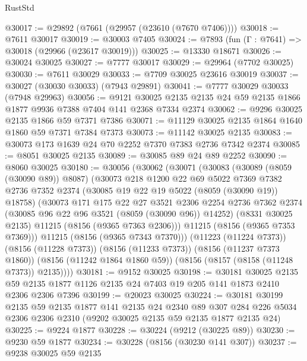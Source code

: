 \begin{lexlean}{RustStd}
\begin{coremodule}
{\begin{coremodule}
{{{{{{{{{{{{{{{{{{{{{{{{{{{{{{{{{{@30017 := @29892 (@7661 (@29957 (@23610 (@7670 @7406))))
@30018 := @7611 @30017
@30019 := @30003 @7405
@30024 := @7893 (fun (Γ : @7641) => @30018 (@29966 (@23617 @30019)))
@30025 := @13330 @18671
@30026 := @30024 @30025
@30027 := @7777 @30017
@30029 := @29964 (@7702 @30025)
@30030 := @7611 @30029
@30033 := @7709 @30025 @23616 @30019
@30037 := @30027 (@30030 @30033) (@7943 @29891)
@30041 := @7777 @30029 @30033 (@7948 @29963)
@30056 := @9121
    @30025
    @2135
    @2135
    @24
    @59
    @2135
    @1866
    @1877
    @9936
    @7388
    @7404
    @141
    @2368
    @7334
    @2374
@30062 := @9296 @30025 @2135 @1866 @59 @7371 @7386
@30071 := @11129 @30025 @2135 @1864 @1640 @1860 @59 @7371 @7384 @7373
@30073 := @11142 @30025 @2135
@30083 := @30073 @173 @1639 @24 @70 @2252 @7370 @7383 @2736 @7342 @2374
@30085 := @8051 @30025 @2135
@30089 := @30085 @89 @24 @89 @2252
@30090 := @8060 @30025
@30180 := @30056
    (@30062
      (@30071
        (@30083
          (@30089 (@8059 (@30090 @89)) @8087)
          (@30073
            @218
            @1200
            @22
            @69
            @5022
            @7369
            @7382
            @2736
            @7352
            @2374
            (@30085 @19 @22 @19 @5022 (@8059 (@30090 @19)) @18758)
            (@30073
              @171
              @175
              @22
              @27
              @3521
              @2306
              @2254
              @2736
              @7362
              @2374
              (@30085 @96 @22 @96 @3521 (@8059 (@30090 @96)) @14252)
              (@8331 @30025 @2135)
              @11215
              (@8156 (@9365 @7363 @2306)))
            @11215
            (@8156 (@9365 @7353 @7369)))
          @11215
          (@8156 (@9365 @7343 @7370)))
        (@11223 (@11224 @7373))
        (@8156 (@11228 @7373))
        (@8156 (@11233 @7373))
        (@8156 (@11237 @7373 @1860))
        (@8156 (@11242 @1864 @1860 @59))
        (@8156 (@8157 (@8158 (@11248 @7373)) @2135))))
@30181 := @9152 @30025
@30198 := @30181
    @30025
    @2135
    @59
    @2135
    @1877
    @1126
    @2135
    @24
    @7403
    @19
    @205
    @141
    @1873
    @2410
    @2306
    @2306
    @7396
@30199 := @20023 @30025
@30224 := @30181
    @30199
    @2135
    @59
    @2135
    @1877
    @141
    @2135
    @24
    @2340
    @89
    @307
    @284
    @226
    @5034
    @2306
    @2306
    @2310
    (@9202 @30025 @2135 @59 @2135 @1877 @2135 @24)
@30225 := @9224 @1877
@30228 := @30224 (@9212 (@30225 @89))
@30230 := @9230 @59 @1877
@30234 := @30228 (@8156 (@30230 @141 @307))
@30237 := @9238 @30025 @59 @2135
}}}}}}}}}}}}}}}}}}}}}}}}}}}}}}}}}}
\end{coremodule}}
\end{coremodule}
\end{lexlean}
